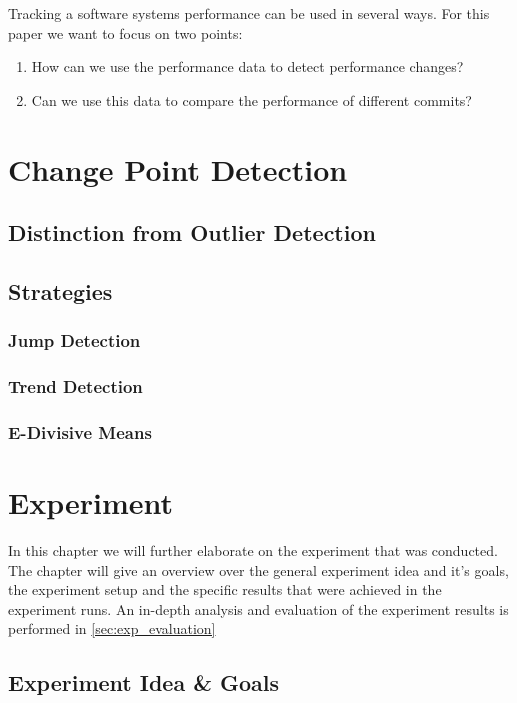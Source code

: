 \documentclass[	runningheads,
				a4paper]{llncs}
\begin{document}
	Tracking a software systems performance can be used in several ways. For this paper we want to focus on two points:
	\begin{enumerate}
		\item How can we use the performance data to detect performance changes?
		\item Can we use this data to compare the performance of different commits?
	\end{enumerate}

	\section{Change Point Detection}
	\subsection{Distinction from Outlier Detection}
	\subsection{Strategies}
	\subsubsection{Jump Detection}
	\subsubsection{Trend Detection}
	\subsubsection{E-Divisive Means}

\section{Experiment}
In this chapter we will further elaborate on the experiment that was conducted. The chapter will give an overview over the general experiment idea and it's goals, the experiment setup and the specific results that were achieved in the experiment runs. An in-depth analysis and evaluation of the experiment results is performed in \autoref{sec:exp_evaluation}

	\subsection{Experiment Idea \& Goals}
	\label{ssec:exp_goals}
\end{document}
